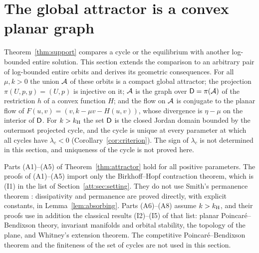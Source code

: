 \section{The global attractor is a convex planar graph}\label{sec:attractor}
Theorem~\ref{thm:support} compares a cycle or the equilibrium with another log-bounded entire solution. This section extends the comparison to an arbitrary pair of log-bounded entire orbits and derives its geometric consequences. For all $\mu,k>0$ the union $\mathcal A$ of these orbits is a compact global attractor; the projection $\pi(U,p,y)=(U,p)$ is injective on it; $\mathcal A$ is the graph over $\mathsf D=\pi(\mathcal A)$ of the restriction $h$ of a convex function $H$; and the flow on $\mathcal A$ is conjugate to the planar flow of $F(u,v)=(v,k-\mu v-H(u,v))$, whose divergence is $\eta-\mu$ on the interior of $\mathsf D$. For $k>k_{\mathrm H}$ the set $\mathsf D$ is the closed Jordan domain bounded by the outermost projected cycle, and the cycle is unique at every parameter at which all cycles have $\lambda_c<0$ (Corollary~\ref{cor:criterion}). The sign of $\lambda_c$ is not determined in this section, and uniqueness of the cycle is not proved here.

Parts (A1)--(A5) of Theorem~\ref{thm:attractor} hold for all positive parameters. The proofs of (A1)--(A5) import only the Birkhoff--Hopf contraction theorem, which is (I1) in the list of Section~\ref{att:sec:setting}. They do not use Smith's permanence theorem \cite{Smith12}: dissipativity and permanence are proved directly, with explicit constants, in Lemma~\ref{lem:absorbing}. Parts (A6)--(A8) assume $k>k_{\mathrm H}$, and their proofs use in addition the classical results (I2)--(I5) of that list: planar Poincar\'e--Bendixson theory, invariant manifolds and orbital stability, the topology of the plane, and Whitney's extension theorem. The competitive Poincar\'e--Bendixson theorem and the finiteness of the set of cycles \cite{Smith12} are not used in this section.

